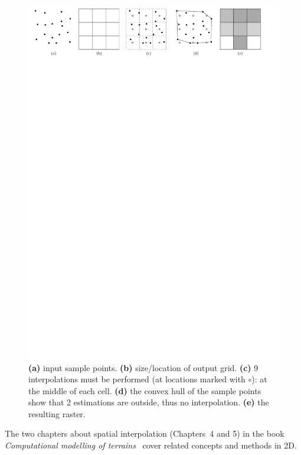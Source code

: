 \begin{figure}
  \centering
  \includegraphics[width=\linewidth]{figs/r-interpolation}
  \caption[Interpolations of sample points into a raster]{\textbf{(a)} input sample points. \textbf{(b)} size/location of output grid. \textbf{(c)} 9 interpolations must be performed (at locations marked with $\circ$): at the middle of each cell. \textbf{(d)} the convex hull of the sample points show that 2 estimations are outside, thus no interpolation. \textbf{(e)} the resulting raster.}%
\label{fig:r-interpolation}
\end{figure}

\begin{kaobox}[frametitle=\faExternalLink\ To read or to watch.]
  The two chapters about spatial interpolation (Chapters~4 and 5) in the book \emph{Computational modelling of terrains}~\citep{terrain_book} cover related concepts and methods in 2D.
\end{kaobox}

